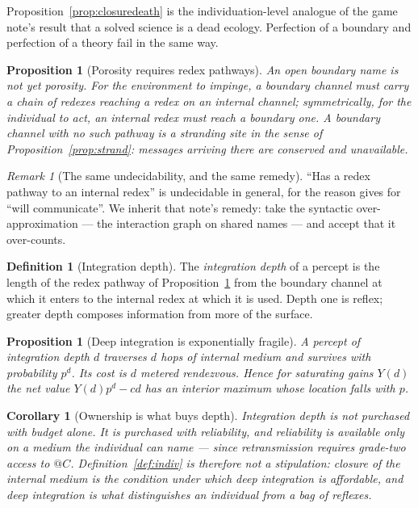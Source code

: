 \documentclass[11pt]{article}
\theoremstyle{plain}
\newtheorem{proposition}[theorem]{Proposition}
\newtheorem{corollary}[theorem]{Corollary}
\theoremstyle{definition}
\newtheorem{definition}[theorem]{Definition}
\theoremstyle{remark}
\newtheorem{remark}[theorem]{Remark}
\begin{document}
Proposition~\ref{prop:closuredeath} is the individuation-level analogue of
the game note's result that a solved science is a dead ecology. Perfection
of a boundary and perfection of a theory fail in the same way.

\begin{proposition}[Porosity requires redex pathways]\label{prop:pathway}
An open boundary name is not yet porosity. For the environment to impinge,
a boundary channel must carry a chain of redexes reaching a redex on an
internal channel; symmetrically, for the individual to act, an internal
redex must reach a boundary one. A boundary channel with no such pathway is
a stranding site in the sense of Proposition~\ref{prop:strand}: messages
arriving there are conserved and unavailable.
\end{proposition}

\begin{remark}[The same undecidability, and the same remedy]
``Has a redex pathway to an internal redex'' is undecidable in general, for
the reason \cite[\S12.5]{scientist} gives for ``will communicate''. We
inherit that note's remedy: take the syntactic over-approximation --- the
interaction graph on shared names --- and accept that it over-counts.
\end{remark}

\begin{definition}[Integration depth]
The \emph{integration depth} of a percept is the length of the redex
pathway of Proposition~\ref{prop:pathway} from the boundary channel at
which it enters to the internal redex at which it is used. Depth one is
reflex; greater depth composes information from more of the surface.
\end{definition}

\begin{proposition}[Deep integration is exponentially fragile]
\label{prop:fragile}
A percept of integration depth $d$ traverses $d$ hops of internal medium
and survives with probability $p^d$. Its cost is $d$ metered rendezvous.
Hence for saturating gains $Y(d)$ the net value $Y(d)p^d - cd$ has an
interior maximum whose location falls with $p$.
\end{proposition}

\begin{corollary}[Ownership is what buys depth]\label{cor:owndepth}
Integration depth is not purchased with budget alone. It is purchased with
reliability, and reliability is available only on a medium the individual
can name --- since retransmission requires grade-two access to $@C$.
Definition~\ref{def:indiv} is therefore not a stipulation: closure of the
internal medium is the condition under which deep integration is
affordable, and deep integration is what distinguishes an individual from a
bag of reflexes.
\end{corollary}
\end{document}
